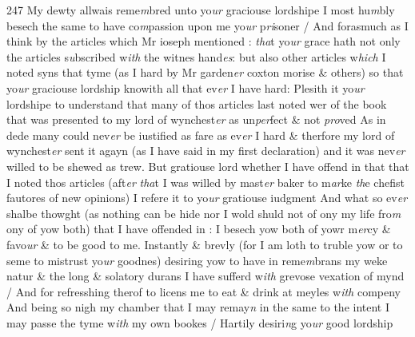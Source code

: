 \documentclass[12pt, a4paper]{book}
\begin{document}
{\color{Mahogany}247} My dewty allwais reme\textit{m}bred unto yo\textit{ur} graciouse lordshipe I most hu\textit{m}bly besech the same to have co\textit{m}passion upon me yo\textit{ur }p\textit{ri}soner / And forasmuch as I think by the articles which Mr ioseph mentioned : \textit{tha}t yo\textit{ur} grace hath not only the articles s\textit{u}bscribed w\textit{ith} the witnes hand\textit{es}: but also other articles w\textit{hich} I noted syns that tyme (as I hard by Mr garden\textit{er} coxton morise \& others) so that yo\textit{ur} graciouse lordship knowith all that  ev\textit{er }I have hard: Plesith it yo\textit{ur} lordshipe to understand that many of thos articles last noted wer of the book that was presented 
				\marginpar[\vspace{0.5cm}{\textcolor{Gray}{ntonien}}]{}
			 to my lord of wynchest\textit{er} as un\textit{per}fect \& not \textit{pro}ved As in dede many could  nev\textit{er} be iustified as fare as ev\textit{er} I hard \& therfore my lord of wynchest\textit{er} sent it agayn (as I have said in my first declaration) and it was nev\textit{er} willed to be shewed as trew. But gratiouse lord whether I have offend in that that I noted thos articles (aft\textit{er}
               \textit{tha}t I was willed by  mast\textit{er} baker to m\textit{ar}ke \textit{th}e chefist fautores of new opinions) I refere it to yo\textit{ur} gratiouse iudgment And what so ev\textit{er} shalbe thowght (as nothing can be hide nor I wold shuld not of ony my life fro\textit{m} ony of yow both) that I have offended in : I besech yow both of yowr m\textit{er}cy \& favo\textit{ur} \& to be good to me. Instantly \& brevly (for I am loth to truble yow or to seme to mistrust yo\textit{ur }goodnes) desiring yow to have in reme\textit{m}brans my weke natur \& the long \& solatory durans I have sufferd w\textit{ith} grevose vexation of mynd / And for refresshing therof to licens me to eat \& drink at meyles w\textit{ith} compeny And being so nigh my chamber that I may remay\textit{n} in the same to the intent I may passe the tyme w\textit{ith} my own  bookes / Hartily desiri\textit{n}g yo\textit{ur} good lordship
\end{document}
